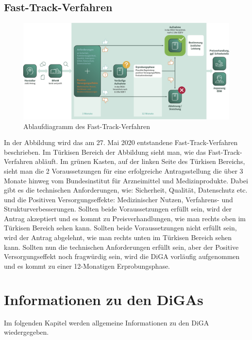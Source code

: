 \documentclass{article}
\begin{document}
		\subsection{Fast-Track-Verfahren} 
			\begin{figure}[htbp]
				\includegraphics[width=\textwidth]{./grafiken/fast-track-verfahren}
				\caption[Ablaufdiagramm des Fast-Track-Verfahren]{Ablaufdiagramm des Fast-Track-Verfahren}
				\label{Abb-ft-Verfahren}
			\end{figure}
			In der Abbildung wird das am 27. Mai 2020 entstandene Fast-Track-Verfahren beschrieben. Im Türkisen Bereich der Abbildung sieht man, wie das Fast-Track-Verfahren abläuft. Im grünen Kasten, auf der linken Seite des Türkisen Bereichs, sieht man die 2 Voraussetzungen für eine erfolgreiche Antragsstellung die über 3 Monate hinweg vom Bundesinstitut für Arzneimittel und Medizinprodukte. Dabei gibt es die technischen Anforderungen, wie: Sicherheit, Qualität, Datenschutz etc. und die Positiven Versorgungseffekte: Medizinischer Nutzen, Verfahrens- und Strukturverbesserungen. Sollten beide Voraussetzungen erfüllt sein, wird der Antrag akzeptiert und es kommt zu Preisverhandlungen, wie man rechts oben im Türkisen Bereich sehen kann. Sollten beide Voraussetzungen nicht erfüllt sein, wird der Antrag abgelehnt, wie man rechts unten im Türkisen Bereich sehen kann. Sollten nun die technischen Anforderungen erfüllt sein, aber der Positive Versorgungseffekt noch fragwürdig sein, wird die DiGA vorläufig aufgenommen und es kommt zu einer 12-Monatigen Erprobungsphase.
		\newpage
	\section{Informationen zu den DiGAs}   
		Im folgenden Kapitel werden allgemeine Informationen zu den DiGA wiedergegeben.
\end{document}
